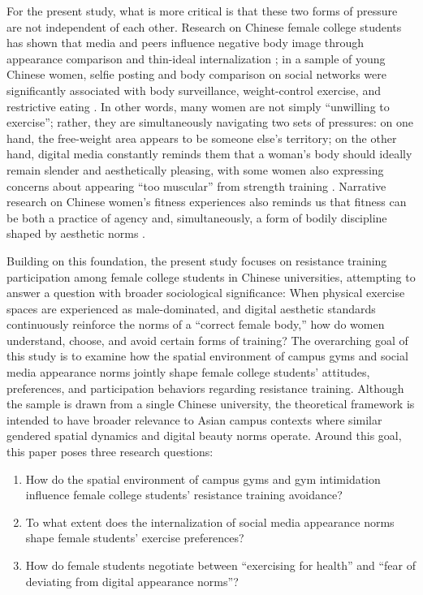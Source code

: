For the present study, what is more critical is that these two forms of pressure are not independent of each other.
Research on Chinese female college students has shown that media and peers influence negative body image through appearance comparison and thin-ideal internalization \parencite{shen2022media}; in a sample of young Chinese women, selfie posting and body comparison on social networks were significantly associated with body surveillance, weight-control exercise, and restrictive eating \parencite{yao2020selfie}.
In other words, many women are not simply ``unwilling to exercise''; rather, they are simultaneously navigating two sets of pressures:
on one hand, the free-weight area appears to be someone else's territory; on the other hand, digital media constantly reminds them that a woman's body should ideally remain slender and aesthetically pleasing, with some women also expressing concerns about appearing ``too muscular'' from strength training \parencite{peters2019barriers}.
Narrative research on Chinese women's fitness experiences also reminds us that fitness can be both a practice of agency and, simultaneously, a form of bodily discipline shaped by aesthetic norms \parencite{xiong2021fanshen}.

Building on this foundation, the present study focuses on resistance training participation among female college students in Chinese universities, attempting to answer a question with broader sociological significance:
When physical exercise spaces are experienced as male-dominated, and digital aesthetic standards continuously reinforce the norms of a ``correct female body,'' how do women understand, choose, and avoid certain forms of training?
The overarching goal of this study is to examine how the spatial environment of campus gyms and social media appearance norms jointly shape female college students' attitudes, preferences, and participation behaviors regarding resistance training.
Although the sample is drawn from a single Chinese university, the theoretical framework is intended to have broader relevance to Asian campus contexts where similar gendered spatial dynamics and digital beauty norms operate.
Around this goal, this paper poses three research questions:

\begin{enumerate}[label=RQ\arabic*:, leftmargin=*]
  \item How do the spatial environment of campus gyms and gym intimidation influence female college students' resistance training avoidance?
  \item To what extent does the internalization of social media appearance norms shape female students' exercise preferences?
  \item How do female students negotiate between ``exercising for health'' and ``fear of deviating from digital appearance norms''?
\end{enumerate}

